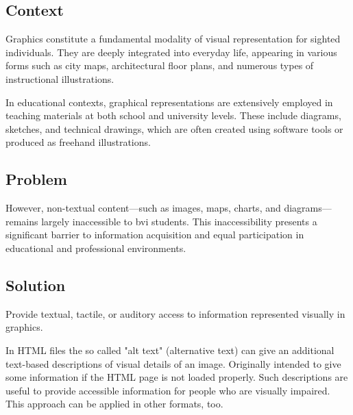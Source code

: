 \patternThree

\subsection*{Context}

    Graphics constitute a fundamental modality of visual representation for sighted individuals. They are deeply integrated into everyday life, appearing in various forms such as city maps, architectural floor plans, and numerous types of instructional illustrations.

In educational contexts, graphical representations are extensively employed in teaching materials at both school and university levels. These include diagrams, sketches, and technical drawings, which are often created using software tools or produced as freehand illustrations.

    
\subsection*{Problem}

\begin{itshape}

However, non-textual content—such as images, maps, charts, and diagrams—remains largely inaccessible to \ac{bvi} students. This inaccessibility presents a significant barrier to information acquisition and equal participation in educational and professional environments.

\end{itshape}

\subsection*{Solution}

\begin{sol}

Provide textual, tactile, or auditory access to information represented visually in graphics.
  
\end{sol}

In HTML files the so called "alt text"  (alternative text) can give an additional text-based descriptions of visual details of an image. 
Originally intended to give some information if the HTML page is not loaded properly. 
Such descriptions are useful to provide accessible information for people who are visually impaired. This approach can be applied in other formats, too.


